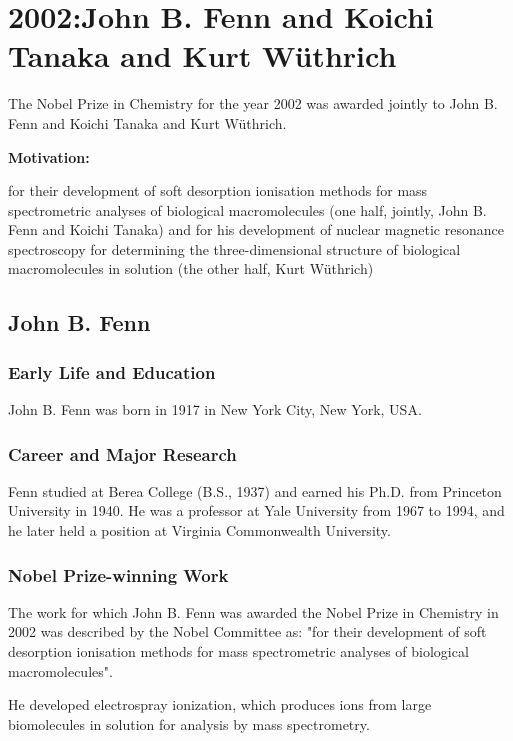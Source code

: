\chapter{2002:John B. Fenn and Koichi Tanaka and Kurt Wüthrich}

\label{chap:chemistry2002}

The Nobel Prize in Chemistry for the year 2002 was awarded jointly to John B. Fenn and Koichi Tanaka and Kurt Wüthrich.

\textbf{Motivation:}

for their development of soft desorption ionisation methods for mass spectrometric analyses of biological macromolecules (one half, jointly, John B. Fenn and Koichi Tanaka) and for his development of nuclear magnetic resonance spectroscopy for determining the three-dimensional structure of biological macromolecules in solution (the other half, Kurt Wüthrich)

\section{John B. Fenn}

\subsection*{Early Life and Education}

John B. Fenn was born in 1917 in New York City, New York, USA.

\subsection*{Career and Major Research}

Fenn studied at Berea College (B.S., 1937) and earned his Ph.D. from Princeton University in 1940. He was a professor at Yale University from 1967 to 1994, and he later held a position at Virginia Commonwealth University.

\subsection*{Nobel Prize-winning Work}

The work for which John B. Fenn was awarded the Nobel Prize in Chemistry in 2002 was described by the Nobel Committee as: "for their development of soft desorption ionisation methods for mass spectrometric analyses of biological macromolecules".

He developed electrospray ionization, which produces ions from large biomolecules in solution for analysis by mass spectrometry.

